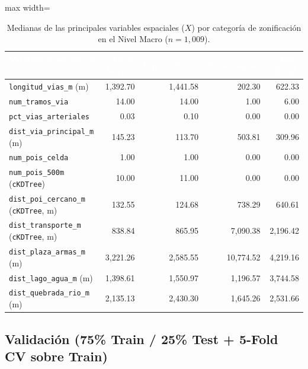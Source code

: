 \documentclass[11pt,a4paper]{article}
\begin{document}
\begin{table}[H]
    \centering
    \caption{Medianas de las principales variables espaciales ($X$) por categoría de zonificación en el Nivel Macro ($n = 1{,}009$).}
    \label{tab:medianas_macro}
    \setlength{\tabcolsep}{4pt}
    \footnotesize
    \begin{adjustbox}{max width=\textwidth}
    \begin{tabular}{lrrrr}
        \toprule
        \rowcolor{verdeHeader}
        \textcolor{white}{\textbf{Variable Espacial ($X$)}} & \textcolor{white}{\textbf{Áreas Verdes}} & \textcolor{white}{\textbf{Equip./Prod.}} & \textcolor{white}{\textbf{Rural/Agríc.}} & \textcolor{white}{\textbf{Urb. Resid.}} \\
        \midrule
        \texttt{longitud\_vias\_m} (m) & 1{,}392.70 & 1{,}441.58 & 202.30 & 622.33 \\
        \rowcolor{verdeSuave!50}
        \texttt{num\_tramos\_via} & 14.00 & 14.00 & 1.00 & 6.00 \\
        \texttt{pct\_vias\_arteriales} & 0.03 & 0.10 & 0.00 & 0.00 \\
        \rowcolor{verdeSuave!50}
        \texttt{dist\_via\_principal\_m} (m) & 145.23 & 113.70 & 503.81 & 309.96 \\
        \texttt{num\_pois\_celda} & 1.00 & 1.00 & 0.00 & 0.00 \\
        \rowcolor{verdeSuave!50}
        \texttt{num\_pois\_500m} (\texttt{cKDTree}) & 10.00 & 11.00 & 0.00 & 0.00 \\
        \texttt{dist\_poi\_cercano\_m} (\texttt{cKDTree}, m) & 132.55 & 124.68 & 738.29 & 640.61 \\
        \rowcolor{verdeSuave!50}
        \texttt{dist\_transporte\_m} (\texttt{cKDTree}, m) & 838.84 & 865.95 & 7{,}090.38 & 2{,}196.42 \\
        \texttt{dist\_plaza\_armas\_m} (m) & 3{,}221.26 & 2{,}585.55 & 10{,}774.52 & 4{,}219.16 \\
        \rowcolor{verdeSuave!50}
        \texttt{dist\_lago\_agua\_m} (m) & 1{,}398.61 & 1{,}550.97 & 1{,}196.57 & 3{,}744.58 \\
        \texttt{dist\_quebrada\_rio\_m} (m) & 2{,}135.13 & 2{,}430.30 & 1{,}645.26 & 2{,}531.66 \\
        \bottomrule
    \end{tabular}
    \end{adjustbox}
\end{table}


\subsection{Validación (75\% Train / 25\% Test + 5-Fold CV sobre Train)}
\end{document}
